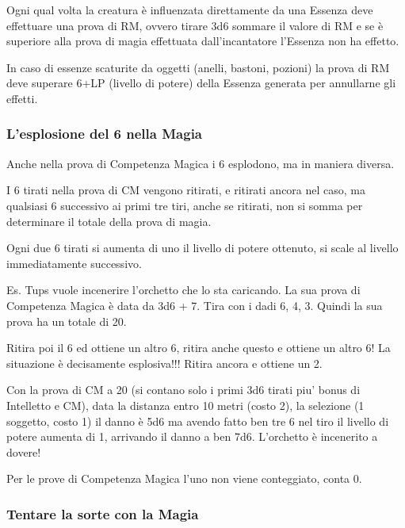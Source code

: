 \documentclass[a4paper,11pt,twoside,openany]{book}
\begin{document}
Ogni qual volta la creatura è influenzata direttamente da una Essenza deve effettuare una prova di RM, ovvero tirare 3d6 sommare il valore di RM e se è superiore alla prova di magia effettuata dall'incantatore l'Essenza non ha effetto.

In caso di essenze scaturite da oggetti (anelli, bastoni, pozioni) la prova di RM deve superare 6+LP (livello di potere) della Essenza generata per annullarne gli effetti.

\subsubsection{L'esplosione del 6 nella Magia}

\label{lesplosione-del-6-nella-magia}

Anche nella prova di Competenza Magica i 6 esplodono, ma in maniera diversa.

I 6 tirati nella prova di CM vengono ritirati, e ritirati ancora nel caso, ma qualsiasi 6 successivo ai primi tre tiri, anche se ritirati, non si somma per determinare il totale della prova di magia.

Ogni due 6 tirati si aumenta di uno il livello di potere ottenuto, si scale al livello immediatamente successivo.

Es. Tups vuole incenerire l'orchetto che lo sta caricando. La sua prova di Competenza Magica è data da 3d6 + 7. Tira con i dadi 6, 4, 3. Quindi la sua prova ha un totale di 20.

Ritira poi il 6 ed ottiene un altro 6, ritira anche questo e ottiene un altro 6! La situazione è decisamente esplosiva!!! Ritira ancora e ottiene un 2.

Con la prova di CM a 20 (si contano solo i primi 3d6 tirati piu' bonus di Intelletto e CM), data la distanza entro 10 metri (costo 2), la selezione (1 soggetto, costo 1) il danno è 5d6 ma avendo fatto ben tre 6 nel tiro il livello di potere aumenta di 1, arrivando il danno a ben 7d6. L'orchetto è incenerito a dovere!

Per le prove di Competenza Magica l'uno non viene conteggiato, conta 0.

\subsubsection{Tentare la sorte con la Magia}

\label{tentare-la-sorte-con-la-magia}
\end{document}
